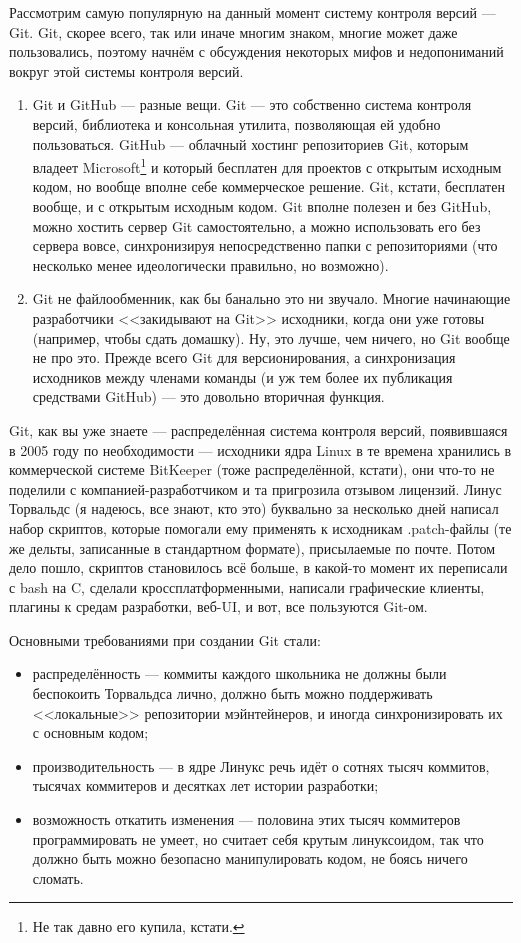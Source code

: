 \documentclass{../../text-style}
\begin{document}
Рассмотрим самую популярную на данный момент систему контроля версий --- Git. Git, скорее всего, так или иначе многим знаком, многие может даже пользовались, поэтому начнём с обсуждения некоторых мифов и недопониманий вокруг этой системы контроля версий.

\begin{enumerate}
    \item Git и GitHub --- разные вещи. Git --- это собственно система контроля версий, библиотека и консольная утилита, позволяющая ей удобно пользоваться. GitHub --- облачный хостинг репозиториев Git, которым владеет Microsoft\footnote{Не так давно его купила, кстати.} и который бесплатен для проектов с открытым исходным кодом, но вообще вполне себе коммерческое решение. Git, кстати, бесплатен вообще, и с открытым исходным кодом. Git вполне полезен и без GitHub, можно хостить сервер Git самостоятельно, а можно использовать его без сервера вовсе, синхронизируя непосредственно папки с репозиториями (что несколько менее идеологически правильно, но возможно).
    \item Git не файлообменник, как бы банально это ни звучало. Многие начинающие разработчики <<закидывают на Git>> исходники, когда они уже готовы (например, чтобы сдать домашку). Ну, это лучше, чем ничего, но Git вообще не про это. Прежде всего Git для версионирования, а синхронизация исходников между членами команды (и уж тем более их публикация средствами GitHub) --- это довольно вторичная функция.
\end{enumerate}

Git, как вы уже знаете --- распределённая система контроля версий, появившаяся в 2005 году по необходимости --- исходники ядра Linux в те времена хранились в коммерческой системе BitKeeper (тоже распределённой, кстати), они что-то не поделили с компанией-разработчиком и та пригрозила отзывом лицензий. Линус Торвальдс (я надеюсь, все знают, кто это) буквально за несколько дней написал набор скриптов, которые помогали ему применять к исходникам .patch-файлы (те же дельты, записанные в стандартном формате), присылаемые по почте. Потом дело пошло, скриптов становилось всё больше, в какой-то момент их переписали с bash на C, сделали кроссплатформенными, написали графические клиенты, плагины к средам разработки, веб-UI, и вот, все пользуются Git-ом.

Основными требованиями при создании Git стали:

\begin{itemize}
    \item распределённость --- коммиты каждого школьника не должны были беспокоить Торвальдса лично, должно быть можно поддерживать <<локальные>> репозитории мэйнтейнеров, и иногда синхронизировать их с основным кодом;
    \item производительность --- в ядре Линукс речь идёт о сотнях тысяч коммитов, тысячах коммитеров и десятках лет истории разработки;
    \item возможность откатить изменения --- половина этих тысяч коммитеров программировать не умеет, но считает себя крутым линуксоидом, так что должно быть можно безопасно манипулировать кодом, не боясь ничего сломать.
\end{itemize}
\end{document}
